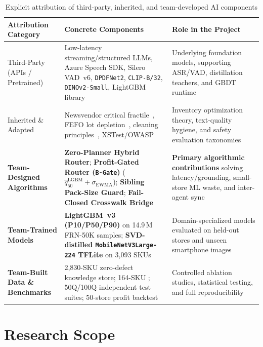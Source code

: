 \begin{table}[H]
\centering
\caption{Explicit attribution of third-party, inherited, and team-developed AI components}
\label{tab:contribution_matrix}
\footnotesize
\begin{tabularx}{\textwidth}{L{3.1cm} L{4.7cm} Y}
\toprule
\textbf{Attribution Category} & \textbf{Concrete Components} & \textbf{Role in the Project} \\
\midrule
Third-Party (APIs / Pretrained) & Low-latency streaming/structured LLMs, Azure Speech SDK, Silero VAD~v6, \texttt{DPDFNet2}, \texttt{CLIP-B/32}, \texttt{DINOv2-Small}, LightGBM library & Underlying foundation models, supporting ASR/VAD, distillation teachers, and GBDT runtime \\
Inherited \& Adapted & Newsvendor critical fractile~\cite{silver2017inventory}, FEFO lot depletion~\cite{nahmias2011perishable},  cleaning principles~\cite{hf_datatrove}, XSTest/OWASP & Inventory optimization theory, text-quality hygiene, and safety evaluation taxonomies \\
\textbf{Team-Designed Algorithms} & \textbf{Zero-Planner Hybrid Router}; \textbf{Profit-Gated Router (\texttt{B-Gate})} ($\hat{q}_{50}^{\text{LGBM}} + \sigma_{\text{EWMA}}$); \textbf{Sibling Pack-Size Guard}; \textbf{Fail-Closed Crosswalk Bridge} & \textbf{Primary algorithmic contributions} solving latency/grounding, small-store ML waste, and inter-agent sync \\
\textbf{Team-Trained Models} & \textbf{LightGBM~v3 (P10/P50/P90)} on 14.9\,M FRN-50K samples; \textbf{SVD-distilled \texttt{MobileNetV3Large-224} TFLite} on 3,093 SKUs & Domain-specialized models evaluated on held-out stores and unseen smartphone images \\
\textbf{Team-Built Data \& Benchmarks} & 2,830-SKU zero-defect knowledge store; 164-SKU ; 50Q/100Q independent test suites; 50-store profit backtest & Controlled ablation studies, statistical testing, and full reproducibility \\
\bottomrule
\end{tabularx}
\end{table}

\section{Research Scope}

